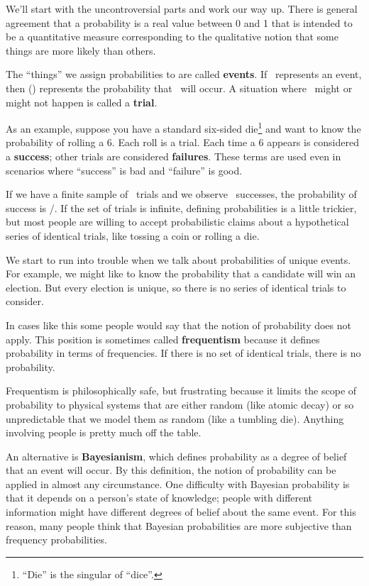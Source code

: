 \documentclass[12pt]{book}
\begin{document}
We'll start with the uncontroversial parts and work our way up.  There
is general agreement that a probability is a real value between 0 and
1 that is intended to be a quantitative measure corresponding to the
qualitative notion that some things are more likely than others.

The ``things'' we assign probabilities to are called {\bf events}.  If
\E~represents an event, then \Prob(\E) represents the probability that
\E~will occur.  A situation where \E~might or might not happen is
called a {\bf trial}.

As an example, suppose you have a standard six-sided
die\footnote{``Die'' is the singular of ``dice''.} and want to know
the probability of rolling a 6.  Each roll is a trial.
Each time a 6 appears is considered a {\bf success}; other trials are
considered {\bf failures}.  These terms are used even in scenarios
where ``success'' is bad and ``failure'' is good.

If we have a finite sample of \n~trials and we observe \s~successes,
the probability of success is \s/\n.  If the set of trials is
infinite, defining probabilities is a little trickier, but most people
are willing to accept probabilistic claims about a hypothetical series
of identical trials, like tossing a coin or rolling a die.

We start to run into trouble when we talk about probabilities of
unique events.  For example, we might like to know the probability
that a candidate will win an election.  But every election is unique,
so there is no series of identical trials to consider.

In cases like this some people would say that the notion of
probability does not apply.  This position is sometimes called {\bf
  frequentism} because it defines probability in terms of frequencies.
If there is no set of identical trials, there is no probability.

Frequentism is philosophically safe, but
frustrating because it limits the scope of probability to physical
systems that are either random (like atomic decay) or so unpredictable
that we model them as random (like a tumbling die).  Anything involving
people is pretty much off the table.

An alternative is {\bf Bayesianism}, which defines probability as
a degree of belief that an event will occur.  By this definition,
the notion of probability can be applied in almost any circumstance.
One difficulty with Bayesian probability is that it depends on
a person's state of knowledge; people with different information
might have different degrees of belief about the same event.  For
this reason, many people think that Bayesian probabilities are
more subjective than frequency probabilities.
\end{document}
